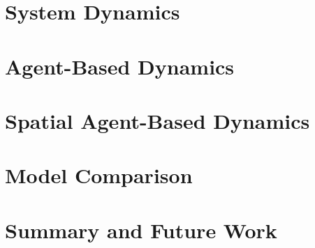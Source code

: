 \documentclass[10pt]{article}
\begin{document}
\section{System Dynamics}


\section{Agent-Based Dynamics}



\section{Spatial Agent-Based Dynamics}



\section{Model Comparison}



\section{Summary and Future Work}



%




\end{document}
